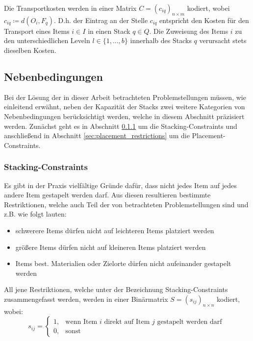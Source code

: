 \vfill
\pagebreak

Die Transportkosten werden in einer Matrix $C = (c_{iq})_{n \times m}$ kodiert,
wobei $c_{iq} \coloneqq d(O_i, F_q)$. D.h. der Eintrag an der Stelle $c_{iq}$ entspricht
den Kosten für den Transport eines Items $i \in I$ in einen Stack $q \in Q$.
Die Zuweisung des Items $i$ zu den unterschiedlichen Leveln $l \in \{1, ..., b\}$ innerhalb des Stacks $q$
verursacht stets dieselben Kosten.

\subsection{Nebenbedingungen}
\label{sec:constraints}

Bei der Lösung der in dieser Arbeit betrachteten Problemstellungen müssen, wie einleitend erwähnt,
neben der Kapazität der Stacks zwei weitere Kategorien von Nebenbedingungen berücksichtigt werden, welche in diesem Abschnitt
präzisiert werden. Zunächst geht es in Abschnitt \ref{sec:stacking_restrictions} um die Stacking-Constraints
und anschließend in Abschnitt \ref{sec:placement_restrictions} um die Placement-Constraints.

\subsubsection{Stacking-Constraints}
\label{sec:stacking_restrictions}

Es gibt in der Praxis vielfältige Gründe dafür, dass nicht jedes Item auf jedes andere Item gestapelt werden darf.
Aus diesen resultieren bestimmte Restriktionen, welche auch Teil der von \citet{Bruns2015} betrachteten Problemstellungen
sind und z.B. wie folgt lauten:
\begin{itemize}
  \item schwerere Items dürfen nicht auf leichteren Items platziert werden
  \item größere Items dürfen nicht auf kleineren Items platziert werden
  \item Items best. Materialien oder Zielorte dürfen nicht aufeinander gestapelt werden
\end{itemize}

All jene Restriktionen, welche unter der Bezeichnung Stacking-Constraints zusammengefasst werden,
werden in einer Binärmatrix $S = (s_{ij})_{n \times n}$ kodiert, wobei:
\[
    s_{ij} =
\begin{cases}
    1, & \text{wenn Item $i$ direkt auf Item $j$ gestapelt werden darf }\\
    0, & \text{sonst}
\end{cases}
\]

